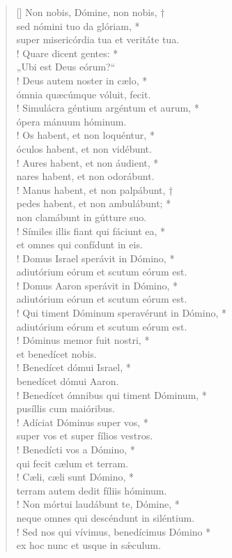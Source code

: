 \begin{verse}[\versewidth]
Non nobis, Dómine, non nobis, †\\
sed nómini tuo da glóriam, *\\
super misericórdia tua et veritáte tua.\\!
\vin  Quare dicent gentes: *\\
\vin  „Ubi est Deus eórum?“\\! %
Deus autem noster in cælo, *\\
ómnia quæcúmque vóluit, fecit.\\!
\vin  Simulácra géntium argéntum et aurum, *\\
\vin  ópera mánuum hóminum.\\!
Os habent, et non loquéntur, *\\
óculos habent, et non vidébunt.\\!
\vin  Aures habent, et non áudient, *\\
\vin  nares habent, et non odorábunt.\\!
Manus habent, et non palpábunt, †\\
pedes habent, et non ambulábunt; *\\
non clamábunt in gútture suo.\\!
\vin  Símiles illis fiant qui fáciunt ea, *\\
\vin  et omnes qui confídunt in eis.\\!
Domus Israel sperávit in Dómino, *\\
adiutórium eórum et scutum eórum est.\\!
\vin  Domus Aaron sperávit in Dómino, *\\
\vin  adiutórium eórum et scutum eórum est.\\!
Qui timent Dóminum speravérunt in Dómino, *\\
adiutórium eórum et scutum eórum est.\\!
\vin  Dóminus memor fuit nostri, *\\
\vin  et benedícet nobis.\\!
Benedícet dómui Israel, *\\
benedícet dómui Aaron.\\!
\vin  Benedícet ómnibus qui timent Dóminum, *\\
\vin  pusíllis cum maióribus.\\! 
Adíciat Dóminus super vos, *\\
super vos et super fílios vestros.\\! %
\vin  Benedícti vos a Dómino, *\\
\vin  qui fecit cælum et terram.\\! 
Cæli, cæli sunt Dómino, *\\
terram autem dedit fíliis hóminum.\\!
\vin  Non mórtui laudábunt te, Dómine, *\\
\vin  neque omnes qui descéndunt in siléntium.\\!
Sed nos qui vívimus, benedícimus Dómino *\\
ex hoc nunc et usque in s\'{æ}culum.
\end{verse}
\vspace{1cm}